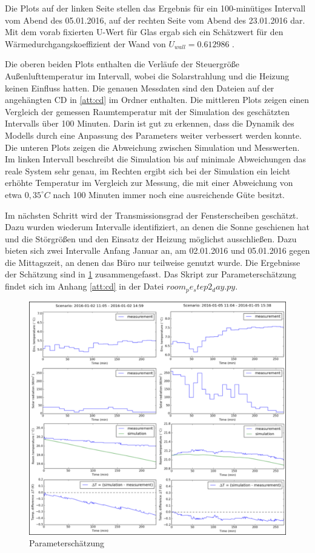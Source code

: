 Die Plots auf der linken Seite stellen das Ergebnis für ein 100-minütiges Intervall vom Abend des 05.01.2016, auf der rechten Seite vom Abend des 23.01.2016 dar. Mit dem vorab fixierten U-Wert für Glas ergab sich ein Schätzwert für den Wärmedurchgangskoeffizient der Wand von $U_{wall}=0.612986$ .

Die oberen beiden Plots enthalten die Verläufe der Steuergröße Außenlufttemperatur im Intervall, wobei die Solarstrahlung und die Heizung keinen Einfluss hatten. Die genauen Messdaten sind den Dateien auf der angehängten CD in \ref{att:cd} im Ordner enthalten. Die mittleren Plots zeigen einen Vergleich der gemessen Raumtemperatur mit der Simulation des geschätzten Intervalls über 100 Minuten. Darin ist gut zu erkennen, dass die Dynamik des Modells durch eine Anpassung des Parameters weiter verbessert werden konnte. Die unteren Plots zeigen die Abweichung zwischen Simulation und Messwerten. Im linken Intervall beschreibt die Simulation bis auf minimale Abweichungen das reale System sehr genau, im Rechten ergibt sich bei der Simulation ein leicht erhöhte Temperatur im Vergleich zur Messung, die mit einer Abweichung von etwa $0,35^{\circ}C$ nach 100 Minuten immer noch eine ausreichende Güte besitzt.

Im nächsten Schritt wird der Transmissionsgrad der Fensterscheiben geschätzt. Dazu wurden wiederum Intervalle identifiziert, an denen die Sonne geschienen hat und die Störgrößen und den Einsatz der Heizung möglichst ausschließen. Dazu bieten sich zwei Intervalle Anfang Januar an, am 02.01.2016 und 05.01.2016 gegen die Mittagszeit, an denen das Büro nur teilweise genutzt wurde. Die Ergebnisse der Schätzung sind in \ref{fig:step2} zusammengefasst. Das Skript zur Parameterschätzung findet sich im Anhang \ref{att:cd} in der Datei $room_pe_step2_day.py$.

\begin{figure}
\centering
\includegraphics[width=\textwidth]{abbildungen/20160329_pestep2}
\caption{Parameterschätzung}
\label{fig:step2}
\end{figure}

